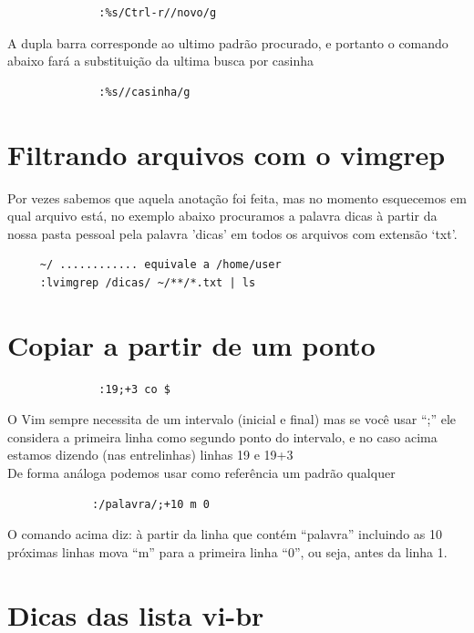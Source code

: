 \documentclass[10pt,a4paper,openany]{book}
\begin{document}
\begin{verbatim}
			  :%s/Ctrl-r//novo/g
\end{verbatim}

A dupla barra corresponde ao ultimo padrão procurado, e portanto o
comando abaixo fará a substituição da ultima busca por casinha

\begin{verbatim}
			  :%s//casinha/g
\end{verbatim}

\section{Filtrando arquivos com o vimgrep}
\label{Filtrando arquivos com o vimgrep}

Por vezes sabemos que aquela anotação foi feita, mas no momento esquecemos em qual
arquivo está, no exemplo abaixo procuramos a palavra dicas à partir da nossa pasta pessoal
pela palavra 'dicas' em todos os arquivos com extensão `txt'.

\begin{verbatim}
	 ~/ ............ equivale a /home/user
	 :lvimgrep /dicas/ ~/**/*.txt | ls
\end{verbatim}


\section{Copiar a partir de um ponto}

\begin{verbatim}
			  :19;+3 co $
\end{verbatim}

O Vim sempre necessita de um intervalo (inicial e final) mas se você
usar ``;'' ele considera a primeira linha como segundo ponto do
intervalo, e no caso acima estamos dizendo (nas entrelinhas) linhas
19 e 19+3     \\


De forma análoga podemos usar como referência um padrão qualquer

\begin{verbatim}
			 :/palavra/;+10 m 0
\end{verbatim}

O comando acima diz: à partir da linha que contém ``palavra'' incluindo as 10 próximas linhas
mova ``m'' para a primeira linha ``0'', ou seja, antes da linha 1.

\section{Dicas das lista vi-br}
\end{document}
